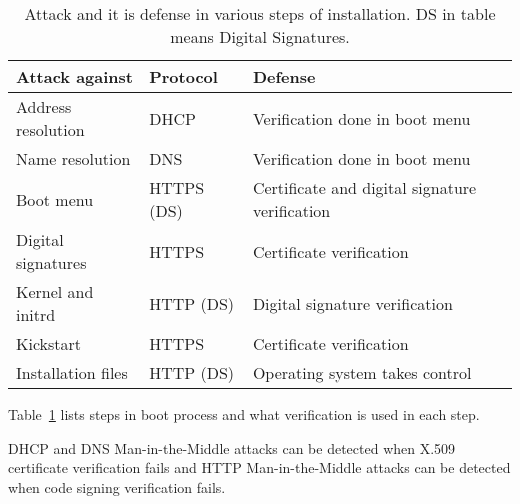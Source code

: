 \begin{table}[!ht]
  \def\arraystretch{1.1}%
  \begin{center}
    \caption{Attack and it is defense in various steps of
      installation. DS in table means Digital
      Signatures.\label{tab:attack_and_defence}}
    \begin{tabular}{| l | l | l |}
      \hline
      Attack against     & Protocol   & Defense                                        \\
      \hline
      Address resolution & DHCP       & Verification done in boot menu              \\
      Name resolution    & DNS        & Verification done in boot menu              \\
      Boot menu          & HTTPS (DS) & Certificate and digital signature verification \\
      Digital signatures & HTTPS      & Certificate verification                     \\
      Kernel and initrd  & HTTP (DS)  & Digital signature verification               \\
      Kickstart          & HTTPS      & Certificate verification                     \\
      Installation files & HTTP (DS)  & Operating system takes control               \\
      \hline
    \end{tabular}
  \end{center}
\end{table}

Table~\ref{tab:attack_and_defence} lists steps in boot process and
what verification is used in each step.

DHCP and DNS Man-in-the-Middle attacks can be detected when X.509
certificate verification fails and HTTP Man-in-the-Middle attacks can
be detected when code signing verification fails.


